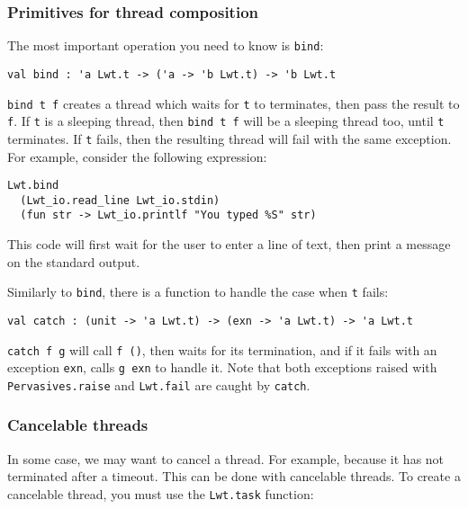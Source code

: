 \subsubsection{ Primitives for thread composition }

The most important operation you need to know is {\tt bind}:



\lstset{language=[Objective]Caml}\begin{lstlisting}
val bind : 'a Lwt.t -> ('a -> 'b Lwt.t) -> 'b Lwt.t

\end{lstlisting}
{\tt bind t f} creates a thread which waits for {\tt t} to
terminates, then pass the result to {\tt f}. If {\tt t} is a
sleeping thread, then {\tt bind t f} will be a sleeping thread too,
until {\tt t} terminates. If {\tt t} fails, then the resulting
thread will fail with the same exception. For example, consider the
following expression:



\lstset{language=[Objective]Caml}\begin{lstlisting}
Lwt.bind
  (Lwt_io.read_line Lwt_io.stdin)
  (fun str -> Lwt_io.printlf "You typed %S" str)

\end{lstlisting}
This code will first wait for the user to enter a line of text, then
print a message on the standard output.



Similarly to {\tt bind}, there is a function to handle the case
when {\tt t} fails:



\lstset{language=[Objective]Caml}\begin{lstlisting}
val catch : (unit -> 'a Lwt.t) -> (exn -> 'a Lwt.t) -> 'a Lwt.t

\end{lstlisting}
{\tt catch f g} will call {\tt f ()}, then waits for its
termination, and if it fails with an exception {\tt exn}, calls
{\tt g exn} to handle it. Note that both exceptions raised with
{\tt Pervasives.raise} and {\tt Lwt.fail} are caught by
{\tt catch}.



\subsubsection{ Cancelable threads }

In some case, we may want to cancel a thread. For example, because it
has not terminated after a timeout. This can be done with cancelable
threads. To create a cancelable thread, you must use the
{\tt Lwt.task} function:




